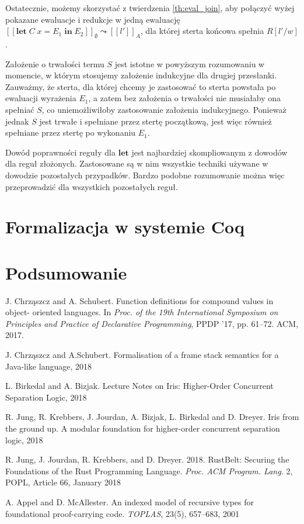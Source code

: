 \documentclass[]{pracamgr}
\renewcommand \| {\hspace{0.75em} | \hspace{0.75em} }
\renewcommand \[ {[\![}
\renewcommand \] {]\!]}
\newcommand \eval [1] {\overset{#1}{\leadsto}}
\theoremstyle{definition}
\newcommand{\jlet}{\mathbf{let}\xspace}
\newcommand{\jin}{\mathbf{in}\xspace}
\newcommand{\letin}[4]{\jlet\; #1\; #2 = #3\; \jin\; #4\xspace}
\begin{document}
Ostatecznie, możemy skorzystać z twierdzenia \ref{th:eval_join}, aby połączyć wyżej pokazane ewaluacje
i redukcje w jedną ewaluację 
$\[ \letin{C}{x}{E_1}{E_2}\]_\emptyset \eval{} \[ l' \]_A$, dla której sterta końcowa spełnia $R[l'/w]$.

Założenie o trwałości termu $S$ jest istotne w powyższym rozumowaniu w momencie, w którym stosujemy
założenie indukcyjne dla drugiej przesłanki. Zauważmy, że sterta, dla której chcemy je zastosować
to sterta powstała po ewaluacji wyrażenia $E_1$, a zatem bez założenia o trwałości nie musiałaby
ona spełniać $S$, co uniemożliwiłoby zastosowanie założenia indukcyjnego.
Ponieważ jednak $S$ jest trwałe i spełniane przez stertę początkową, jest więc również spełniane
przez stertę po wykonaniu $E_1$.

Dowód poprawności reguły dla $\jlet$ jest najbardziej skompliowanym z dowodów dla reguł złożonych.
Zastosowane są w nim wszystkie techniki używane w dowodzie pozostałych przypadków.
Bardzo podobne rozumowanie można więc przeprowadzić dla wszystkich pozostałych reguł.

\chapter{Formalizacja w systemie Coq}

\chapter{Podsumowanie}

\appendix
\begin{thebibliography}{99}

 J. Chrząszcz and A. Schubert. Function definitions for compound values in object-
oriented languages. In \textit{Proc. of the 19th International Symposium on Principles
and Practice of Declarative Programming}, PPDP ’17, pp. 61–72. ACM, 2017.

 J. Chrząszcz and A.Schubert. Formalisation of a frame stack semantics for a Java-like language, 2018

 L. Birkedal and A. Bizjak. Lecture Notes on Iris: Higher-Order
Concurrent Separation Logic, 2018

 R. Jung, R. Krebbers, J. Jourdan, A. Bizjak, L. Birkedal and D. Dreyer.
Iris from the ground up. A modular foundation for higher-order concurrent separation logic, 2018

 R. Jung, J. Jourdan, R. Krebbers, and D. Dreyer. 2018. RustBelt: Securing the
Foundations of the Rust Programming Language. \textit{Proc. ACM Program. Lang.} 2, POPL,
Article 66, January 2018

 A. Appel and D. McAllester. An indexed model of recursive types for
foundational proof-carrying code. \textit{TOPLAS}, 23(5), 657–683, 2001




\end{thebibliography}
\end{document}
